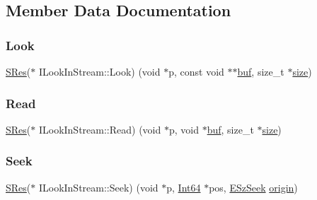 \subsection{Member Data Documentation}
\mbox{\label{struct_i_look_in_stream_af4fdaf14775170775b985d378e5cd3b8}} 
\subsubsection{\texorpdfstring{Look}{Look}}
{\footnotesize\ttfamily \mbox{\hyperlink{7z_types_8h_acc0053eeb62726b68b22e8c7d9e91367}{S\+Res}}($\ast$ I\+Look\+In\+Stream\+::\+Look) (void $\ast$p, const void $\ast$$\ast$\mbox{\hyperlink{ioapi_8h_a8ad8a13c88886b9f623034ff88570adb}{buf}}, size\+\_\+t $\ast$\mbox{\hyperlink{ioapi_8h_a014d89bd76f74ef3a29c8f04b473eb76}{size}})}

\mbox{\label{struct_i_look_in_stream_a2909f4ae4bd1c192e364591947e105e5}} 
\subsubsection{\texorpdfstring{Read}{Read}}
{\footnotesize\ttfamily \mbox{\hyperlink{7z_types_8h_acc0053eeb62726b68b22e8c7d9e91367}{S\+Res}}($\ast$ I\+Look\+In\+Stream\+::\+Read) (void $\ast$p, void $\ast$\mbox{\hyperlink{ioapi_8h_a8ad8a13c88886b9f623034ff88570adb}{buf}}, size\+\_\+t $\ast$\mbox{\hyperlink{ioapi_8h_a014d89bd76f74ef3a29c8f04b473eb76}{size}})}

\mbox{\label{struct_i_look_in_stream_a26abc2d40e2fbb8ac0864681c53a6e9d}} 
\subsubsection{\texorpdfstring{Seek}{Seek}}
{\footnotesize\ttfamily \mbox{\hyperlink{7z_types_8h_acc0053eeb62726b68b22e8c7d9e91367}{S\+Res}}($\ast$ I\+Look\+In\+Stream\+::\+Seek) (void $\ast$p, \mbox{\hyperlink{7z_types_8h_ade5ca5eec203b16d15253b7c422808bf}{Int64}} $\ast$pos, \mbox{\hyperlink{7z_types_8h_ab0216441b8737c13f5b275408f9e9709}{E\+Sz\+Seek}} \mbox{\hyperlink{ioapi_8h_a5f189a59b66f135978bce54f9d0fcade}{origin}})}

